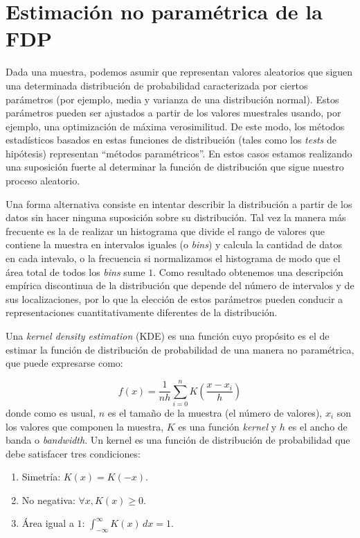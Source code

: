


\section{Estimación no paramétrica de la FDP}\label{sec:est-kde}

Dada una muestra, podemos asumir que representan valores aleatorios que siguen una determinada distribución de probabilidad caracterizada por ciertos parámetros (por ejemplo, media y varianza de una distribución normal). Estos parámetros pueden ser ajustados a partir de los valores muestrales usando, por ejemplo, una optimización de máxima verosimilitud. De este modo, los métodos estadísticos basados en estas funciones de distribución (tales como los \textit{tests} de hipótesis) representan ``métodos paramétricos''. En estos casos estamos realizando una suposición fuerte al determinar la función de distribución que sigue nuestro proceso aleatorio.

Una forma alternativa consiste en intentar describir la distribución a partir de los datos sin hacer ninguna suposición sobre su distribución. Tal vez la manera más frecuente es la de realizar un histograma que divide el rango de valores que contiene la muestra en intervalos iguales (o \textit{bins}) y calcula la cantidad de datos en cada intevalo, o la frecuencia si normalizamos el histograma de modo que el área total de todos los \textit{bins} sume $1$. Como resultado obtenemos una descripción empírica discontinua de la distribución que depende del número de intervalos y de sus localizaciones, por lo que la elección de estos parámetros pueden conducir a representaciones cuantitativamente diferentes de la distribución.

Una \textit{kernel density estimation} (KDE) es una función cuyo propósito es el de estimar la función de distribución de probabilidad de una manera no paramétrica, que puede expresarse como:

\begin{equation}
 f(x) = \frac{1}{nh} \sum_{i=0}^n K \left( \frac{x - x_i}{h} \right)
\end{equation}
donde como es usual, $n$ es el tamaño de la muestra (el número de valores), $x_i$ son los valores que componen la muestra, $K$ es una función \textit{kernel} y $h$ es el ancho de banda o \textit{bandwidth}. Un kernel es una función de distribución de probabilidad que debe satisfacer tres condiciones:
\begin{enumerate}
 \item Simetría: $K(x) = K(-x)$.
 \item No negativa: $\forall x, K(x) \geq 0$.
 \item Área igual a $1$: $\int_{-\infty}^{\infty} K(x) \, dx = 1$.
\end{enumerate}

